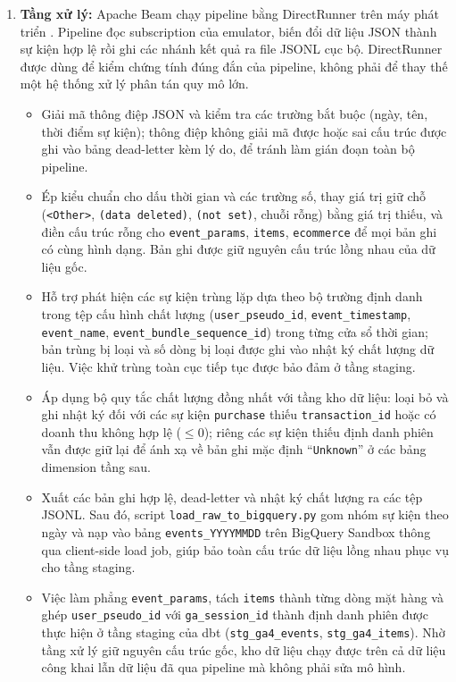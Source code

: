 \begin{enumerate}
    \item \textbf{Tầng xử lý:} Apache Beam chạy pipeline bằng DirectRunner trên máy phát triển \parencite{apache-direct-runner}. Pipeline đọc subscription của emulator, biến đổi dữ liệu JSON thành sự kiện hợp lệ rồi ghi các nhánh kết quả ra file JSONL cục bộ. DirectRunner được dùng để kiểm chứng tính đúng đắn của pipeline, không phải để thay thế một hệ thống xử lý phân tán quy mô lớn.
    \begin{itemize}
        \item Giải mã thông điệp JSON và kiểm tra các trường bắt buộc (ngày, tên, thời điểm sự kiện); thông điệp không giải mã được hoặc sai cấu trúc được ghi vào bảng dead-letter kèm lý do, để tránh làm gián đoạn toàn bộ pipeline.
        \item Ép kiểu chuẩn cho dấu thời gian và các trường số, thay giá trị giữ chỗ (\texttt{<Other>}, \texttt{(data deleted)}, \texttt{(not set)}, chuỗi rỗng) bằng giá trị thiếu, và điền cấu trúc rỗng cho \texttt{event\_params}, \texttt{items}, \texttt{ecommerce} để mọi bản ghi có cùng hình dạng. Bản ghi được giữ nguyên cấu trúc lồng nhau của dữ liệu gốc.
        \item Hỗ trợ phát hiện các sự kiện trùng lặp dựa theo bộ trường định danh trong tệp cấu hình chất lượng (\texttt{user\_pseudo\_id}, \texttt{event\_timestamp}, \texttt{event\_name}, \texttt{event\_bundle\_sequence\_id}) trong từng cửa sổ thời gian; bản trùng bị loại và số dòng bị loại được ghi vào nhật ký chất lượng dữ liệu. Việc khử trùng toàn cục tiếp tục được bảo đảm ở tầng staging.
        \item Áp dụng bộ quy tắc chất lượng đồng nhất với tầng kho dữ liệu: loại bỏ và ghi nhật ký đối với các sự kiện \texttt{purchase} thiếu \texttt{transaction\_id} hoặc có doanh thu không hợp lệ ($\le 0$); riêng các sự kiện thiếu định danh phiên vẫn được giữ lại để ánh xạ về bản ghi mặc định ``\texttt{Unknown}'' ở các bảng dimension tầng sau.
        \item Xuất các bản ghi hợp lệ, dead-letter và nhật ký chất lượng ra các tệp JSONL. Sau đó, script \texttt{load\_raw\_to\_bigquery.py} gom nhóm sự kiện theo ngày và nạp vào bảng \texttt{events\_YYYYMMDD} trên BigQuery Sandbox thông qua client-side load job, giúp bảo toàn cấu trúc dữ liệu lồng nhau phục vụ cho tầng staging.
        \item Việc làm phẳng \texttt{event\_params}, tách \texttt{items} thành từng dòng mặt hàng và ghép \texttt{user\_pseudo\_id} với \texttt{ga\_session\_id} thành định danh phiên được thực hiện ở tầng staging của dbt (\texttt{stg\_ga4\_events}, \texttt{stg\_ga4\_items}). Nhờ tầng xử lý giữ nguyên cấu trúc gốc, kho dữ liệu chạy được trên cả dữ liệu công khai lẫn dữ liệu đã qua pipeline mà không phải sửa mô hình.
    \end{itemize}


\end{enumerate}
